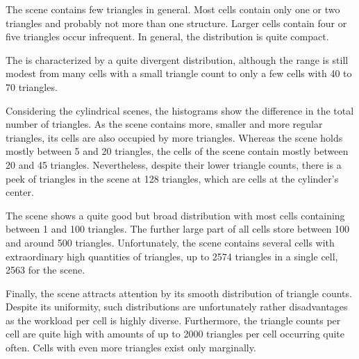 The \cubes scene contains few triangles in general.
Most cells contain only one or two triangles and probably not more than one structure.
Larger cells contain four or five triangles occur infrequent.
In general, the distribution is quite compact.

The \cylinderhead is characterized by a quite divergent distribution, although the range is still modest from many cells with a small triangle count to only a few cells with 40 to 70 triangles.

Considering the cylindrical scenes, the histograms show the difference in the total number of triangles.
As the \cylindersd scene contains more, smaller and more regular triangles, its cells are also occupied by more triangles.
Whereas the \cylinders scene holds mostly between 5 and 20 triangles, the cells of the \cylindersd scene contain mostly between 20 and 45 triangles.
Nevertheless, despite their lower triangle counts, there is a peek of triangles in the \cylinders scene at 128 triangles, which are cells at the cylinder's center.

The \impeller scene shows a quite good but broad distribution with most cells containing between 1 and 100 triangles.
The further large part of all cells store between 100 and around 500 triangles.
Unfortunately, the \impeller scene contains several cells with extraordinary high quantities of triangles, up to 2574 triangles in a single cell, 2563 for the \impellerhalf scene.

Finally, the \turbine scene attracts attention by its smooth distribution of triangle counts.
Despite its uniformity, such distributions are unfortunately rather disadvantages as the workload per cell is highly diverse.
Furthermore, the triangle counts per cell are quite high with amounts of up to 2000 triangles per cell occurring quite often.
Cells with even more triangles exist only marginally.

